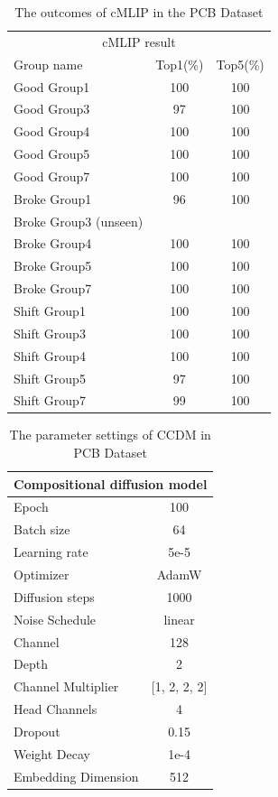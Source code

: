 \begin{table}[H]
    \centering
    \renewcommand{\arraystretch}{1} %
    \begin{tabular}{lcc}
        \hline 
        \multicolumn{3}{c}{cMLIP result} \\ 
        Group name & Top1(\%) & Top5(\%)\\ \hline
        Good Group1 & 100 & 100\\ 
        Good Group3 & 97 & 100\\ 
        Good Group4 & 100 & 100\\ 
        Good Group5 & 100 & 100\\ 
        Good Group7 & 100 & 100\\ 
        Broke Group1 & 96 & 100\\ 
        Broke Group3 (unseen) &  & \\ 
        Broke Group4 & 100 & 100\\ 
        Broke Group5 & 100 & 100\\ 
        Broke Group7 & 100 & 100\\ 
        Shift Group1 & 100 & 100\\ 
        Shift Group3 & 100 & 100\\ 
        Shift Group4 & 100 & 100\\ 
        Shift Group5 & 97 & 100\\
        Shift Group7 & 99 & 100\\ \hline 
    \end{tabular}
    \caption{The outcomes of cMLIP in the PCB Dataset }
    \label{tab:experimental_config}
\end{table}
\begin{table}[H]
    \centering
    \renewcommand{\arraystretch}{1} %
    \begin{tabular}{lc}
        \hline 
        \multicolumn{2}{c}{Compositional diffusion model} \\ \hline
        Epoch & 100\\ 
        Batch size & 64\\ 
        Learning rate & 5e-5\\ 
        Optimizer & AdamW\\ 
        Diffusion steps & 1000\\ 
        Noise Schedule & linear \\ 
        Channel & 128 \\
        Depth & 2 \\ 
        Channel Multiplier & [1, 2, 2, 2]\\ 
        Head Channels & 4\\ 
        Dropout & 0.15\\
        Weight Decay & 1e-4\\
        Embedding Dimension & 512 \\ \hline 
    \end{tabular}
    \caption{The parameter settings of CCDM in PCB Dataset }
    \label{tab:experimental_config}
\end{table}

